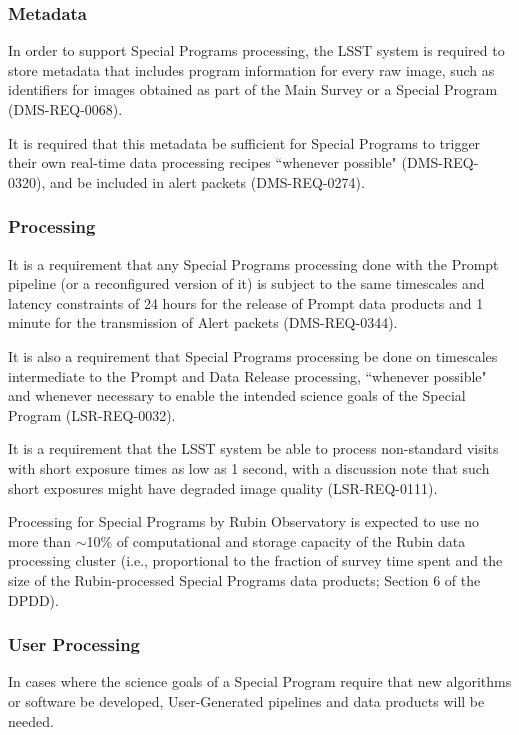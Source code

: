 \documentclass[DM,lsstdoc,toc]{lsstdoc}
\begin{document}
\subsubsection{Metadata}\label{sssec:proc_reqs_meta}

In order to support Special Programs processing, the LSST system is required to store metadata that includes program information for every raw image, such as identifiers for images obtained as part of the Main Survey or a Special Program (DMS-REQ-0068).

It is required that this metadata be sufficient for Special Programs to trigger their own real-time data processing recipes ``whenever possible" (DMS-REQ-0320), and be included in alert packets (DMS-REQ-0274).

\subsubsection{Processing}\label{sssec:proc_reqs_proc}

It is a requirement that any Special Programs processing done with the Prompt pipeline (or a reconfigured version of it) is subject to the same timescales and latency constraints of 24 hours for the release of Prompt data products and 1 minute for the transmission of Alert packets (DMS-REQ-0344).

It is also a requirement that Special Programs processing be done on timescales intermediate to the Prompt and Data Release processing, ``whenever possible" and whenever necessary to enable the intended science goals of the Special Program (LSR-REQ-0032).

It is a requirement that the LSST system be able to process non-standard visits with short exposure times as low as 1 second, with a discussion note that such short exposures might have degraded image quality (LSR-REQ-0111).

Processing for Special Programs by Rubin Observatory is expected to use no more than $\sim$10\% of computational and storage capacity of the Rubin data processing cluster (i.e., proportional to the fraction of survey time spent and the size of the Rubin-processed Special Programs data products; Section 6 of the DPDD).

\subsubsection{User Processing}\label{sssec:proc_reqs_ug}

In cases where the science goals of a Special Program require that new algorithms or software be developed, User-Generated pipelines and data products will be needed.
\end{document}
